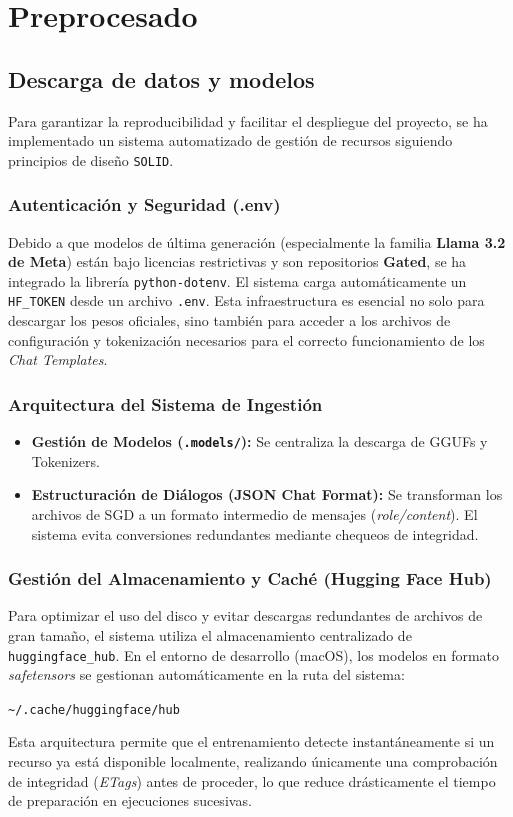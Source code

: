 \section{Preprocesado}
\subsection{Descarga de datos y modelos}

Para garantizar la reproducibilidad y facilitar el despliegue del proyecto, se ha implementado un sistema automatizado de gestión de recursos siguiendo principios de diseño \texttt{SOLID}.

\subsubsection{Autenticación y Seguridad (.env)}

Debido a que modelos de última generación (especialmente la familia \textbf{Llama 3.2 de Meta}) están bajo licencias restrictivas y son repositorios \textbf{Gated}, se ha integrado la librería \texttt{python-dotenv}. El sistema carga automáticamente un \texttt{HF\_TOKEN} desde un archivo \texttt{.env}. Esta infraestructura es esencial no solo para descargar los pesos oficiales, sino también para acceder a los archivos de configuración y tokenización necesarios para el correcto funcionamiento de los \textit{Chat Templates}.

\subsubsection{Arquitectura del Sistema de Ingestión}

\begin{itemize}
    \item \textbf{Gestión de Modelos (\texttt{.models/}):} Se centraliza la descarga de GGUFs y Tokenizers.
    \item \textbf{Estructuración de Diálogos (JSON Chat Format):} Se transforman los archivos de SGD a un formato intermedio de mensajes (\textit{role/content}). El sistema evita conversiones redundantes mediante chequeos de integridad.
\end{itemize}

\subsubsection{Gestión del Almacenamiento y Caché (Hugging Face Hub)}

Para optimizar el uso del disco y evitar descargas redundantes de archivos de gran tamaño, el sistema utiliza el almacenamiento centralizado de \texttt{huggingface\_hub}. En el entorno de desarrollo (macOS), los modelos en formato \textit{safetensors} se gestionan automáticamente en la ruta del sistema:
\begin{center}
    \texttt{\textasciitilde/.cache/huggingface/hub}
\end{center}
Esta arquitectura permite que el entrenamiento detecte instantáneamente si un recurso ya está disponible localmente, realizando únicamente una comprobación de integridad (\textit{ETags}) antes de proceder, lo que reduce drásticamente el tiempo de preparación en ejecuciones sucesivas.

